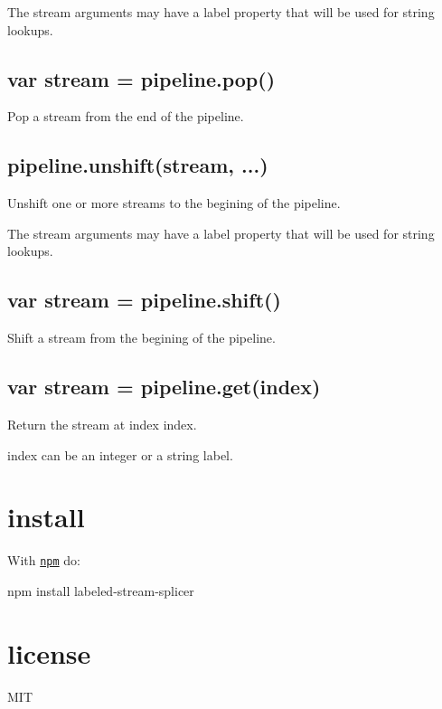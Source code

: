 The stream arguments may have a {\ttfamily label} property that will be used for string lookups.

\subsection*{var stream = pipeline.\+pop()}

Pop a stream from the end of the pipeline.

\subsection*{pipeline.\+unshift(stream, ...)}

Unshift one or more streams to the begining of the pipeline.

The stream arguments may have a {\ttfamily label} property that will be used for string lookups.

\subsection*{var stream = pipeline.\+shift()}

Shift a stream from the begining of the pipeline.

\subsection*{var stream = pipeline.\+get(index)}

Return the stream at index {\ttfamily index}.

{\ttfamily index} can be an integer or a string label.

\section*{install}

With \href{https://npmjs.org}{\tt npm} do\+:


\begin{DoxyCode}
npm install labeled-stream-splicer
\end{DoxyCode}


\section*{license}

M\+IT 
